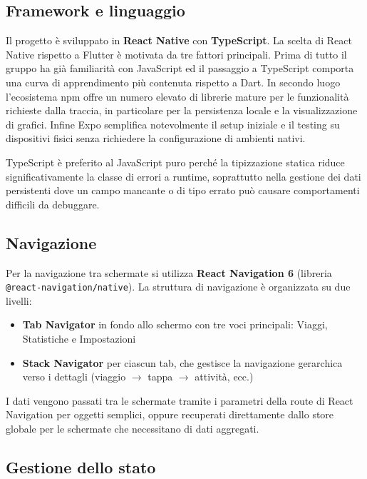 \documentclass[12pt, a4paper]{article}
\begin{document}
\subsection{Framework e linguaggio}

Il progetto è sviluppato in \textbf{React Native} con \textbf{TypeScript}. La scelta
di React Native rispetto a Flutter è motivata da tre fattori principali. Prima di tutto
il gruppo ha già familiarità con JavaScript ed il passaggio a TypeScript comporta
una curva di apprendimento più contenuta rispetto a Dart. In secondo luogo l'ecosistema
npm offre un numero elevato di librerie mature per le funzionalità richieste dalla
traccia, in particolare per la persistenza locale e la visualizzazione di grafici.
Infine Expo semplifica notevolmente il setup iniziale e il testing su dispositivi fisici
senza richiedere la configurazione di ambienti nativi.

TypeScript è preferito al JavaScript puro perché la tipizzazione statica riduce
significativamente la classe di errori a runtime, soprattutto nella gestione dei dati
persistenti dove un campo mancante o di tipo errato può causare comportamenti difficili
da debuggare.

\subsection{Navigazione}

Per la navigazione tra schermate si utilizza \textbf{React Navigation 6} (libreria
\texttt{@react-navigation/native}). La struttura di navigazione è organizzata su due livelli:

\begin{itemize}[leftmargin=1.5em, itemsep=2pt]
  \item \textbf{Tab Navigator} in fondo allo schermo con tre voci principali:
    Viaggi, Statistiche e Impostazioni
  \item \textbf{Stack Navigator} per ciascun tab, che gestisce la navigazione
    gerarchica verso i dettagli (viaggio \(\to\) tappa \(\to\) attività, ecc.)
\end{itemize}

I dati vengono passati tra le schermate tramite i parametri della route di React
Navigation per oggetti semplici, oppure recuperati direttamente dallo store globale
per le schermate che necessitano di dati aggregati.

\subsection{Gestione dello stato}
\end{document}
